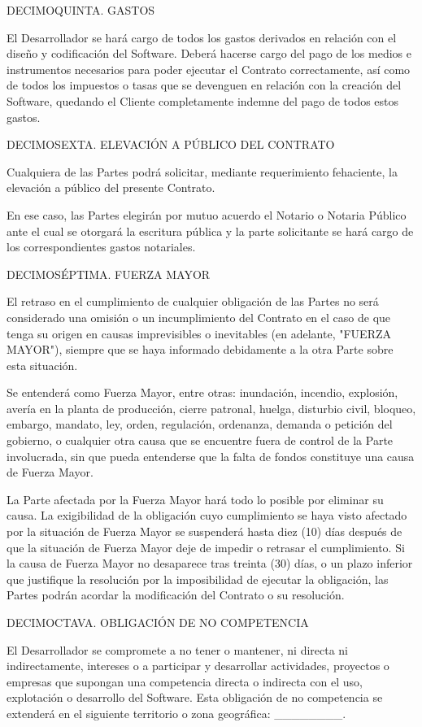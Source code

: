 \documentclass[a4paper,11pt]{report}
\begin{document}
DECIMOQUINTA. GASTOS

El Desarrollador se hará cargo de todos los gastos derivados en relación
con el diseño y codificación del Software. Deberá hacerse cargo del pago
de los medios e instrumentos necesarios para poder ejecutar el Contrato
correctamente, así como de todos los impuestos o tasas que se devenguen
en relación con la creación del Software, quedando el Cliente
completamente indemne del pago de todos estos gastos.

DECIMOSEXTA. ELEVACIÓN A PÚBLICO DEL CONTRATO

Cualquiera de las Partes podrá solicitar, mediante requerimiento
fehaciente, la elevación a público del presente Contrato.

En ese caso, las Partes elegirán por mutuo acuerdo el Notario o Notaria
Público ante el cual se otorgará la escritura pública y la parte
solicitante se hará cargo de los correspondientes gastos notariales.

DECIMOSÉPTIMA. FUERZA MAYOR

El retraso en el cumplimiento de cualquier obligación de las Partes no
será considerado una omisión o un incumplimiento del Contrato en el caso
de que tenga su origen en causas imprevisibles o inevitables (en
adelante, "FUERZA MAYOR"), siempre que se haya informado debidamente a
la otra Parte sobre esta situación.

Se entenderá como Fuerza Mayor, entre otras: inundación, incendio,
explosión, avería en la planta de producción, cierre patronal, huelga,
disturbio civil, bloqueo, embargo, mandato, ley, orden, regulación,
ordenanza, demanda o petición del gobierno, o cualquier otra causa que
se encuentre fuera de control de la Parte involucrada, sin que pueda
entenderse que la falta de fondos constituye una causa de Fuerza Mayor.

La Parte afectada por la Fuerza Mayor hará todo lo posible por eliminar
su causa. La exigibilidad de la obligación cuyo cumplimiento se haya
visto afectado por la situación de Fuerza Mayor se suspenderá hasta diez
(10) días después de que la situación de Fuerza Mayor deje de impedir o
retrasar el cumplimiento. Si la causa de Fuerza Mayor no desaparece tras
treinta (30) días, o un plazo inferior que justifique la resolución por
la imposibilidad de ejecutar la obligación, las Partes podrán acordar la
modificación del Contrato o su resolución.

DECIMOCTAVA. OBLIGACIÓN DE NO COMPETENCIA

El Desarrollador se compromete a no tener o mantener, ni directa ni
indirectamente, intereses o a participar y desarrollar actividades,
proyectos o empresas que supongan una competencia directa o indirecta
con el uso, explotación o desarrollo del Software. Esta obligación de no
competencia se extenderá en el siguiente territorio o zona geográfica:
\_\_\_\_\_\_\_\_.
\end{document}
